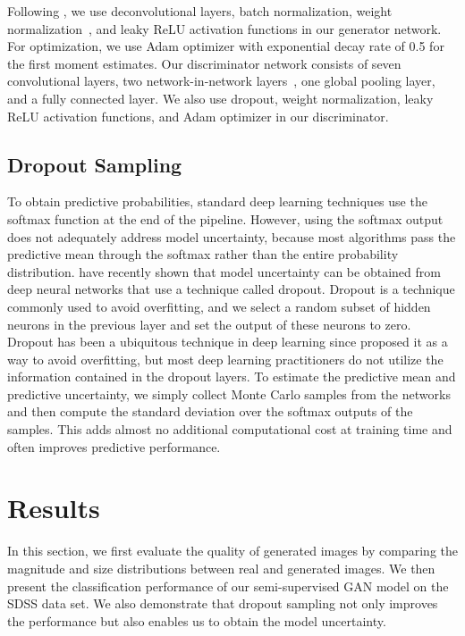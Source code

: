 \documentclass[fleqn,usenatbib]{mnras}
\begin{document}
Following \cite{salimans2016improved}, we use deconvolutional layers, batch normalization, weight normalization~\citep{salimans2016weight},
and leaky ReLU activation functions in our generator network.
For optimization, we use Adam optimizer with exponential decay rate of 0.5 for the first moment estimates.
Our discriminator network consists of seven convolutional layers, two network-in-network layers~\citep{lin2013network}, one global pooling layer,
and a fully connected layer.
We also use dropout, weight normalization, leaky ReLU activation functions, and Adam optimizer in our discriminator.

\subsection{Dropout Sampling}
  \label{sec:dropout_sampling}
 
To obtain predictive probabilities, standard deep learning techniques use the softmax function
at the end of the pipeline.
However, using the softmax output does not adequately address model uncertainty,
because most algorithms pass the predictive mean through the softmax rather than
the entire probability distribution.
\citet{gal2016dropout} have recently shown that model uncertainty
can be obtained from deep neural networks that use a technique called dropout.
Dropout is a technique commonly used to avoid overfitting, and we select a random subset of hidden neurons in the previous layer
and set the output of these neurons to zero.
Dropout has been a ubiquitous technique in deep learning since \citet{hinton2012improving}
proposed it as a way to avoid overfitting, but most deep learning practitioners
do not utilize the information contained in the dropout layers.
To estimate the predictive mean and predictive uncertainty,
we simply collect Monte Carlo samples from the networks and then compute
the standard deviation over the softmax outputs of the samples.
This adds almost no additional computational cost at training time and often improves predictive performance.

\section{Results}
  \label{sec:results}

In this section, we first evaluate the quality of generated images by comparing the magnitude and size distributions
between real and generated images.
We then present the classification performance of our semi-supervised GAN model on the SDSS data set.
We also demonstrate that dropout sampling not only improves the performance but also enables us to obtain the model uncertainty.
\end{document}
